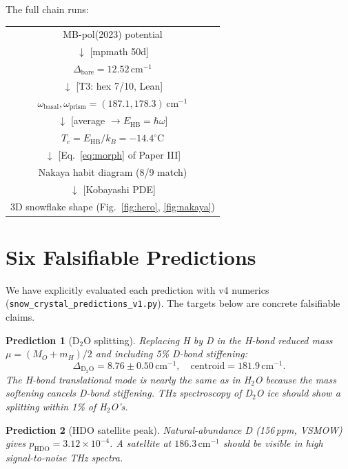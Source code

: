 \documentclass[11pt,a4paper]{article}
\newtheorem{prediction}{Prediction}
\begin{document}
The full chain runs:
\begin{center}
\small
\begin{tabular}{c}
MB-pol(2023) potential\\
$\downarrow$ {\small[mpmath 50d]}\\
$\Delta_\text{bare} = 12.52\,\mathrm{cm}^{-1}$\\
$\downarrow$ {\small[T3: hex 7/10, Lean]}\\
$\omega_\text{basal}, \omega_\text{prism} = (187.1, 178.3)\,\mathrm{cm}^{-1}$\\
$\downarrow$ {\small[average $\to E_\text{HB} = \hbar\omega$]}\\
$T_c = E_\text{HB}/k_B = -14.4^\circ\mathrm{C}$\\
$\downarrow$ {\small[Eq.~\ref{eq:morph} of Paper III]}\\
Nakaya habit diagram (8/9 match)\\
$\downarrow$ {\small[Kobayashi PDE]}\\
3D snowflake shape (Fig.~\ref{fig:hero}, \ref{fig:nakaya})
\end{tabular}
\end{center}

\section{Six Falsifiable Predictions}
\label{sec:predictions}

We have explicitly evaluated each prediction with v4 numerics (\texttt{snow\_crystal\_predictions\_v1.py}). The targets below are concrete falsifiable claims.

\begin{prediction}[D$_2$O splitting]
Replacing H by D in the H-bond reduced mass $\mu = (M_O + m_H)/2$ and including 5\% D-bond stiffening:
\[
\Delta_{\mathrm{D}_2\mathrm{O}} = 8.76 \pm 0.50\,\mathrm{cm}^{-1}, \quad \text{centroid} = 181.9\,\mathrm{cm}^{-1}.
\]
The H-bond translational mode is \emph{nearly the same as in H$_2$O} because the mass softening cancels D-bond stiffening. THz spectroscopy of D$_2$O ice should show a splitting within 1\% of H$_2$O's.
\end{prediction}

\begin{prediction}[HDO satellite peak]
Natural-abundance D (156\,ppm, VSMOW) gives $p_\text{HDO} = 3.12 \times 10^{-4}$. A satellite at $186.3\,\mathrm{cm}^{-1}$ should be visible in high signal-to-noise THz spectra.
\end{prediction}
\end{document}
